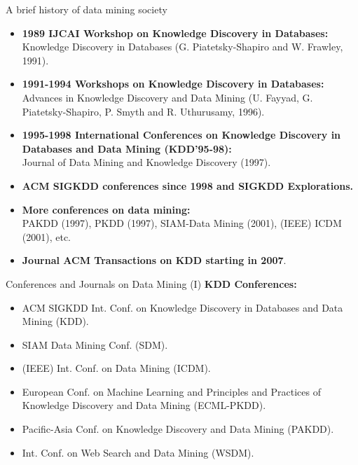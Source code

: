\documentclass[aspectratio=169,t]{beamer}
\begin{document}
 { 
    \begin{frame}{A brief history of data mining society}
        \begin{itemize}
            \item \textbf{1989 IJCAI Workshop on Knowledge Discovery in Databases:}\\
                  Knowledge Discovery in Databases (G. Piatetsky-Shapiro and W. Frawley, 1991).
            \item \textbf{1991-1994 Workshops on Knowledge Discovery in Databases:}\\
                  Advances in Knowledge Discovery and Data Mining (U. Fayyad, G. Piatetsky-Shapiro, P. Smyth and R. Uthurusamy, 1996).
            \item \textbf{1995-1998 International Conferences on Knowledge Discovery in Databases and Data Mining (KDD’95-98):}\\
                  Journal of Data Mining and Knowledge Discovery (1997).
            \item \textbf{ACM SIGKDD conferences since 1998 and SIGKDD Explorations.}\\
            \item \textbf{More conferences on data mining:}\\
                  PAKDD (1997), PKDD (1997), SIAM-Data Mining (2001), (IEEE) ICDM (2001), etc.
            \item \textbf{Journal ACM Transactions on KDD starting in 2007}.
        \end{itemize}
    \end{frame}
  }

  {
    \begin{frame}{Conferences and Journals on Data Mining (I)}
    \textbf{KDD Conferences:}
        \begin{itemize}
            \item ACM SIGKDD Int. Conf. on Knowledge Discovery in Databases and Data Mining (KDD).
            \item SIAM Data Mining Conf. (SDM).
            \item (IEEE) Int. Conf. on Data Mining (ICDM).
            \item European Conf. on Machine Learning and Principles and Practices of Knowledge Discovery and Data Mining (ECML-PKDD).
            \item Pacific-Asia Conf. on Knowledge Discovery and Data Mining (PAKDD).
            \item Int. Conf. on Web Search and Data Mining (WSDM).
        \end{itemize}
    \end{frame}
  }
\end{document}

